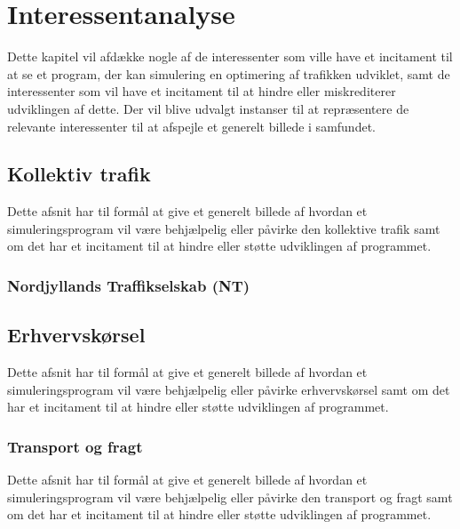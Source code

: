 
\chapter{Interessentanalyse}\label{Interessentanalyse}

Dette kapitel vil afdække nogle af de interessenter som ville have et incitament til at se et program, der kan simulering en optimering af trafikken udviklet, samt de interessenter som vil have et incitament til at hindre eller miskrediterer udviklingen af dette. Der vil blive udvalgt instanser til at repræsentere de relevante interessenter til at afspejle et generelt billede i samfundet.

\section{Kollektiv trafik}\label{Kollektiv-trafik}

Dette afsnit har til formål at give et generelt billede af hvordan et simuleringsprogram vil være behjælpelig eller påvirke den kollektive trafik samt om det har et incitament til at hindre eller støtte udviklingen af programmet.

\subsection{Nordjyllands Traffikselskab (NT)}\label{Nordjyllands-Traffikselskab}



\section{Erhvervskørsel}\label{Erhvervskoersel}

Dette afsnit har til formål at give et generelt billede af hvordan et simuleringsprogram vil være behjælpelig eller påvirke erhvervskørsel samt om det har et incitament til at hindre eller støtte udviklingen af programmet.

\subsection{Transport og fragt}\label{Transport-og-fragt}

Dette afsnit har til formål at give et generelt billede af hvordan et simuleringsprogram vil være behjælpelig eller påvirke den transport og fragt samt om det har et incitament til at hindre eller støtte udviklingen af programmet.

